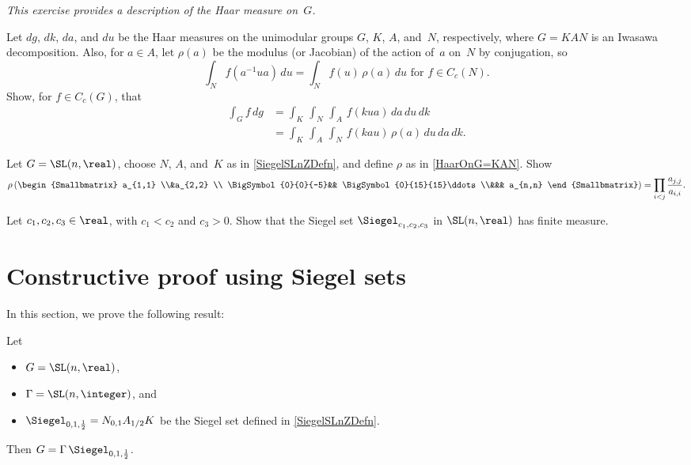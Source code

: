 \begin{exercises}
\item \label{HaarOnG=KAN}
\emph{This exercise provides a description of the Haar measure on~$G$.}

Let $dg$, $dk$, $da$, and $du$ be the Haar measures on the unimodular groups $G$, $K$, $A$, and~$N$, respectively, where $G = KAN$ is an Iwasawa decomposition. Also, for $a \in A$, let $\rho(a)$ be the modulus (or Jacobian) of the action of~$a$ on~$N$ by conjugation, so
	$$ \text{$\int_N f( a^{-1} u a) \, du = \int_N f(u) \, \rho(a) \, du$ for $f \in C_c(N)$} . $$
Show, for $f \in C_c(G)$, that
	\begin{align*}
	\int_G f \, dg 
	&=  \int_K \, \int_N \, \int_A \, f(kua) \, da \, du \, dk
	\\&= \int_K \, \int_A \, \int_N \, f(kau) \, \rho(a) \, du \, da \, dk
	. \end{align*}

\item \label{ModFuncANinSLnR}
Let $G = \SL(n,\real)$, choose $N$, $A$, and~$K$ as in \cref{SiegelSLnZDefn}, and 
define $\rho$ as in \cref{HaarOnG=KAN}. Show
	$$ \rho \left( \begin{Smallbmatrix} a_{1,1} \\&a_{2,2}
	\\ \BigSymbol{0}{0}{-5}&& \BigSymbol{0}{15}{15}\ddots \\&&& a_{n,n} \end{Smallbmatrix} \right) = \prod_{i<j} \frac{a_{j,j}}{a_{i,i}} .$$

\item \label{SiegelSLnRFinMeasEx}
Let $c_1,c_2,c_3 \in \real$, with $c_1 < c_2$ and $c_3 > 0$. Show that the Siegel set $\Siegel_{c_1,c_2,c_3}$ in $\SL(n,\real)$ has finite measure.

\end{exercises}


\section{Constructive proof using Siegel sets} \label{SLNZISLATTSiegelPfSect}

In this section, we prove the following result:

\begin{thm} \label{SiegelFundDomSLnZ}
Let 
	\noprelistbreak
	\begin{itemize}
	\item $G = \SL(n,\real)$, 
	\item $\Gamma = \SL(n,\integer)$, 
	and 
	\item $\Siegel_{0,1,\frac{1}{2}} = N_{0,1} A_{1/2} K$ be the Siegel set defined in \cref{SiegelSLnZDefn}. 
	\end{itemize}
Then $G = \Gamma \, \Siegel_{0,1,\frac{1}{2}}$.
\end{thm}

